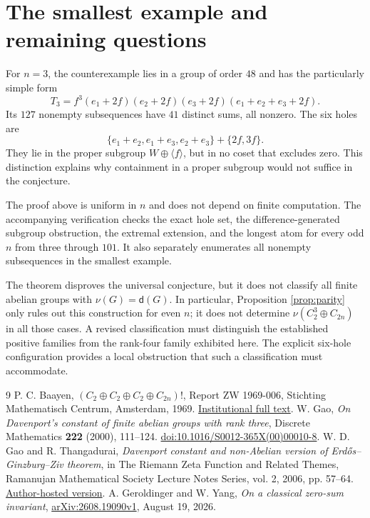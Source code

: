 \documentclass[11pt]{article}
\theoremstyle{definition}
\newcommand{\dd}{\mathsf d}
\begin{document}
\section{The smallest example and remaining questions}

For $n=3$, the counterexample lies in a group of order $48$ and has the particularly simple form
\[
 T_3=f^3(e_1+2f)(e_2+2f)(e_3+2f)(e_1+e_2+e_3+2f).
\]
Its $127$ nonempty subsequences have $41$ distinct sums, all nonzero. The six holes are
\[
 \{e_1+e_2,e_1+e_3,e_2+e_3\}+\{2f,3f\}.
\]
They lie in the proper subgroup $W\oplus\langle f\rangle$, but in no coset that excludes zero. This distinction explains why containment in a proper subgroup would not suffice in the conjecture.

The proof above is uniform in $n$ and does not depend on finite computation. The accompanying verification checks the exact hole set, the difference-generated subgroup obstruction, the extremal extension, and the longest atom for every odd $n$ from three through $101$. It also separately enumerates all nonempty subsequences in the smallest example.

The theorem disproves the universal conjecture, but it does not classify all finite abelian groups with $\nu(G)=\dd(G)$. In particular, Proposition \ref{prop:parity} only rules out this construction for even $n$; it does not determine $\nu(C_2^3\oplus C_{2n})$ in all those cases. A revised classification must distinguish the established positive families from the rank-four family exhibited here. The explicit six-hole configuration provides a local obstruction that such a classification must accommodate.

\begin{thebibliography}{9}
 P. C. Baayen, \emph{$(C_2\oplus C_2\oplus C_2\oplus C_{2n})!$}, Report ZW 1969-006, Stichting Mathematisch Centrum, Amsterdam, 1969. \href{https://ir.cwi.nl/pub/7264}{Institutional full text}.
 W. Gao, \emph{On Davenport's constant of finite abelian groups with rank three}, Discrete Mathematics \textbf{222} (2000), 111--124. \href{https://doi.org/10.1016/S0012-365X(00)00010-8}{doi:10.1016/S0012-365X(00)00010-8}.
 W. D. Gao and R. Thangadurai, \emph{Davenport constant and non-Abelian version of Erd\H{o}s--Ginzburg--Ziv theorem}, in The Riemann Zeta Function and Related Themes, Ramanujan Mathematical Society Lecture Notes Series, vol. 2, 2006, pp. 57--64. \href{https://www.hri.res.in/~thanga/papers/thanga.pdf}{Author-hosted version}.
 A. Geroldinger and W. Yang, \emph{On a classical zero-sum invariant}, \href{https://arxiv.org/abs/2608.19090v1}{arXiv:2608.19090v1}, August 19, 2026.
\end{thebibliography}
\end{document}
